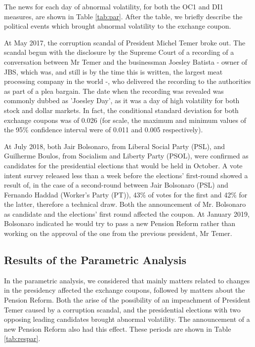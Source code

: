 \documentclass[cic,tc, english]{iiufrgs}
\begin{document}
    The news for each day of abnormal volatility, for both the OC1 and DI1 measures, are shown in Table \ref{tab:par}. After the table, we briefly describe the political events which brought abnormal volatility to the exchange coupon.

    
    
    At May 2017, the corruption scandal of President Michel Temer broke out. The scandal begun with the disclosure by the Supreme Court of a recording of a conversation between Mr Temer and the businessman Joesley Batista - owner of JBS, which was, and still is by the time this is written, the largest meat processing company in the world -, who delivered the recording to the authorities as part of a plea bargain. The date when the recording was revealed was commonly dubbed as 'Joesley Day', as it was a day of high volatility for both stock and dollar markets. In fact, the conditional standard deviation for both exchange coupons was of 0.026 (for scale, the maximum and minimum values of the 95\% confidence interval were of 0.011 and 0.005 respectively).

    At July 2018, both Jair Bolsonaro, from Liberal Social Party (PSL), and Guilherme Boulos, from Socialism and Liberty Party (PSOL), were confirmed as candidates for the presidential elections that would be held in October. A vote intent survey released less than a week before the elections' first-round  showed a result of, in the case of a second-round between Jair Bolsonaro (PSL) and Fernando Haddad (Worker's Party (PT)), 43\% of votes for the first and 42\% for the latter, therefore a technical draw. Both the announcement of Mr. Bolsonaro as candidate and the elections' first round affected the coupon. At January 2019, Bolsonaro indicated he would try to pass a new Pension Reform rather than working on the approval of the one from the previous president, Mr Temer.
    
\subsection{Results of the Parametric Analysis}
    
    In the parametric analysis, we considered that mainly matters related to changes in the presidency affected the exchange coupons, followed by matters about the Pension Reform. Both the arise of the possibility of an impeachment of President Temer caused by a corruption scandal, and the presidential elections with two opposing leading candidates brought abnormal volatility. The announcement of a new Pension Reform also had this effect. These periods are shown in Table \ref{tab:respar}.
\end{document}
